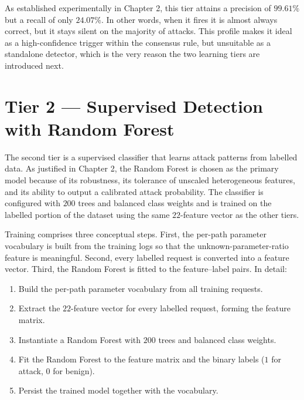 \documentclass[12pt,a4paper]{report}
\begin{document}
As established experimentally in Chapter 2, this tier
attains a precision of $99.61\%$ but a recall of only $24.07\%$. In other
words, when it fires it is almost always correct, but it stays silent on the
majority of attacks. This profile makes it ideal as a high-confidence
trigger within the consensus rule, but unsuitable as a standalone detector,
which is the very reason the two learning tiers are introduced next.

\section{Tier 2 --- Supervised Detection with Random Forest}
\label{sec:tier2}

The second tier is a supervised classifier that learns attack patterns from
labelled data. As justified in Chapter 2, the Random Forest is
chosen as the primary model because of its robustness, its tolerance of
unscaled heterogeneous features, and its ability to output a calibrated
attack probability. The classifier is configured with $200$ trees and
balanced class weights and is trained on the labelled portion of the dataset
using the same $22$-feature vector as the other tiers.

Training comprises three conceptual steps. First, the per-path parameter
vocabulary is built from the training logs so that the
unknown-parameter-ratio feature is meaningful. Second, every labelled
request is converted into a feature vector. Third, the Random Forest is
fitted to the feature--label pairs. In detail:

\begin{enumerate}[leftmargin=1.8em, itemsep=2pt]
  \item Build the per-path parameter vocabulary from all training requests.
  \item Extract the $22$-feature vector for every labelled request, forming
        the feature matrix.
  \item Instantiate a Random Forest with $200$ trees and balanced class
        weights.
  \item Fit the Random Forest to the feature matrix and the binary labels
        ($1$ for attack, $0$ for benign).
  \item Persist the trained model together with the vocabulary.
\end{enumerate}
\end{document}
